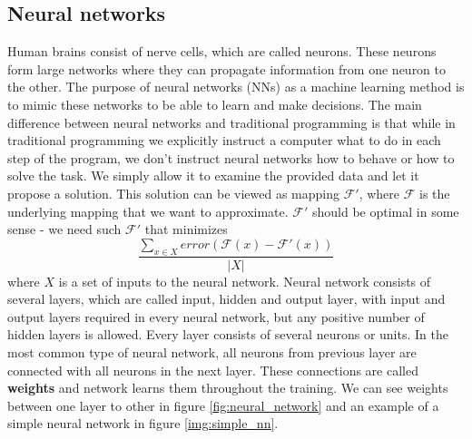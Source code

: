     \subsection{Neural networks}
    Human brains consist of nerve cells, which are called neurons. These neurons form large networks where they can propagate information from one neuron to the other. The purpose of neural networks (NNs) as a machine learning method is to mimic these networks to be able to learn and make decisions. The main difference between neural networks and traditional programming is that while in traditional programming we explicitly instruct a computer what to do in each step of the program, we don't instruct neural networks how to behave or how to solve the task. We simply allow it to examine the provided data and let it propose a solution. This solution can be viewed as mapping $\mathcal{F'}$, where $\mathcal{F}$ is the underlying mapping that we want to approximate. $\mathcal{F'}$ should be optimal in some sense - we need such $\mathcal{F'}$ that minimizes $$\frac{\sum_{x \in X} error(\mathcal{F}(x) - \mathcal{F'}(x))}{|X|}$$ where $X$ is a set of inputs to the neural network.
    \newline
    Neural network consists of several layers, which are called input, hidden and output layer, with input and output layers required in every neural network, but any positive number of hidden layers is allowed. Every layer consists of several neurons or units. In the most common type of neural network, all neurons from previous layer are connected with all neurons in the next layer. These connections are called \textbf{weights} and network learns them throughout the training. We can see weights between one layer to other in figure \ref{fig:neural_network} and an example of a simple neural network in figure \ref{img:simple_nn}.
